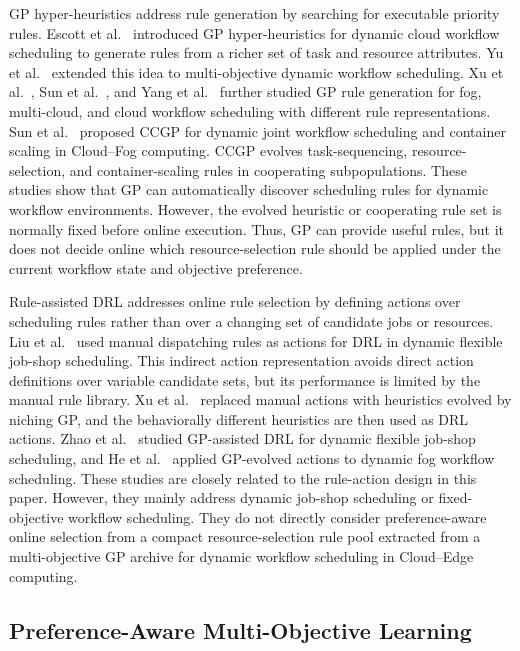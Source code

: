 \documentclass[10pt,journal]{IEEEtran}
\begin{document}
GP hyper-heuristics address rule generation by searching for executable priority rules. Escott et al.~\cite{escott2020gphh} introduced GP hyper-heuristics for dynamic cloud workflow scheduling to generate rules from a richer set of task and resource attributes. Yu et al.~\cite{yu2022mogp} extended this idea to multi-objective dynamic workflow scheduling. Xu et al.~\cite{xu2023mtgp}, Sun et al.~\cite{sun2024mtgp}, and Yang et al.~\cite{yang2025dtgp} further studied GP rule generation for fog, multi-cloud, and cloud workflow scheduling with different rule representations. Sun et al.~\cite{ccgp} proposed CCGP for dynamic joint workflow scheduling and container scaling in Cloud--Fog computing. CCGP evolves task-sequencing, resource-selection, and container-scaling rules in cooperating subpopulations. These studies show that GP can automatically discover scheduling rules for dynamic workflow environments. However, the evolved heuristic or cooperating rule set is normally fixed before online execution. Thus, GP can provide useful rules, but it does not decide online which resource-selection rule should be applied under the current workflow state and objective preference.

Rule-assisted DRL addresses online rule selection by defining actions over scheduling rules rather than over a changing set of candidate jobs or resources. Liu et al.~\cite{liu2022rules} used manual dispatching rules as actions for DRL in dynamic flexible job-shop scheduling. This indirect action representation avoids direct action definitions over variable candidate sets, but its performance is limited by the manual rule library. Xu et al.~\cite{xu2024niching} replaced manual actions with heuristics evolved by niching GP, and the behaviorally different heuristics are then used as DRL actions. Zhao et al.~\cite{zhao2025tdrl} studied GP-assisted DRL for dynamic flexible job-shop scheduling, and He et al.~\cite{he2026evolved} applied GP-evolved actions to dynamic fog workflow scheduling. These studies are closely related to the rule-action design in this paper. However, they mainly address dynamic job-shop scheduling or fixed-objective workflow scheduling. They do not directly consider preference-aware online selection from a compact resource-selection rule pool extracted from a multi-objective GP archive for dynamic workflow scheduling in Cloud--Edge computing.

\subsection{Preference-Aware Multi-Objective Learning}
\end{document}
